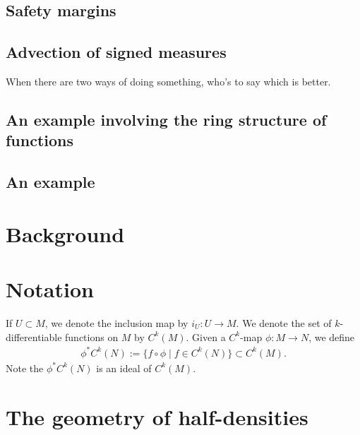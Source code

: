 \documentclass[12pt]{amsart}
\begin{document}
\subsection{Safety margins}
\label{sec:safety}

\subsection{Advection of signed measures}
\label{sec:signed}
When there are two ways of doing something, who's to say which is better.

\subsection{An example involving the ring structure of functions}


\subsection{An example}

\section{Background}
\label{sec:background}

\section{Notation}
  If $U \subset M$, we denote the inclusion map by $i_U:U \to M$.
  We denote the set of $k$-differentiable functions on $M$ by $C^k(M)$.
  Given a $C^k$-map $\phi: M \to N$, we define
  \begin{align*}
    \phi^*C^k(N) := \{ f \circ \phi \mid f \in C^k(N) \} \subset C^k(M).
  \end{align*}
  Note the $\phi^*C^k(N)$ is an ideal of $C^k(M)$.


\section{The geometry of half-densities}
\label{sec:half_densities}
\end{document}
